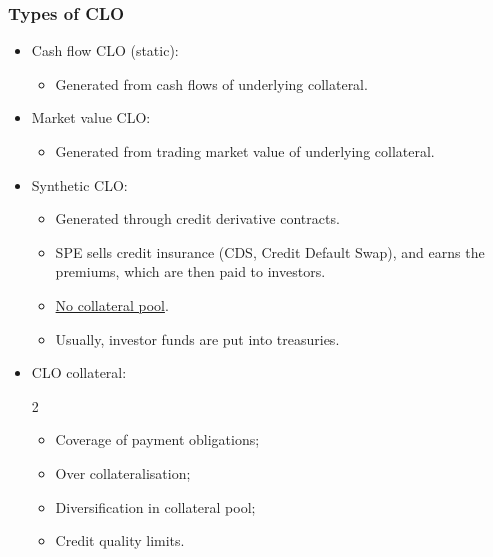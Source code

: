 \documentclass[../notes_compiled.tex]{subfiles}
\begin{document}
\subsubsection{Types of CLO}
\begin{itemize}
\item Cash flow CLO (static):
\begin{itemize}
\item Generated from cash flows of underlying collateral.
\end{itemize}
\item Market value CLO:
\begin{itemize}
\item Generated from trading market value of underlying collateral.
\end{itemize}
\item Synthetic CLO:
\begin{itemize}
\item Generated through credit derivative contracts.
\item SPE sells credit insurance (CDS, Credit Default Swap), and earns the premiums, which are then paid to investors.
\item \underline{No collateral pool}.
\item Usually, investor funds are put into treasuries.
\end{itemize}
\item CLO collateral:
\begin{multicols}{2}
\begin{itemize}
\item Coverage of payment obligations;
\item Over collateralisation;
\item Diversification in collateral pool;
\item Credit quality limits.
\end{itemize}
\end{multicols}
\end{itemize}
\end{document}
